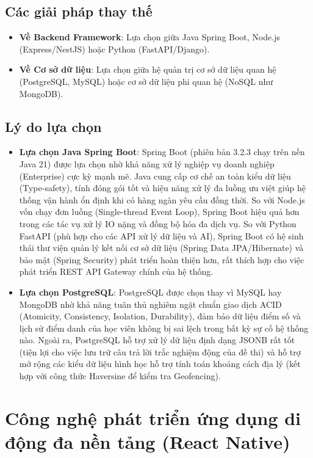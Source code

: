 \documentclass[../DoAn.tex]{subfiles}
\begin{document}
\subsection{Các giải pháp thay thế}
\begin{itemize}
    \item \textbf{Về Backend Framework}: Lựa chọn giữa Java Spring Boot, Node.js (Express/NestJS) hoặc Python (FastAPI/Django).
    \item \textbf{Về Cơ sở dữ liệu}: Lựa chọn giữa hệ quản trị cơ sở dữ liệu quan hệ (PostgreSQL, MySQL) hoặc cơ sở dữ liệu phi quan hệ (NoSQL như MongoDB).
\end{itemize}

\subsection{Lý do lựa chọn}
\begin{itemize}
    \item \textbf{Lựa chọn Java Spring Boot}: Spring Boot (phiên bản 3.2.3 chạy trên nền Java 21) được lựa chọn nhờ khả năng xử lý nghiệp vụ doanh nghiệp (Enterprise) cực kỳ mạnh mẽ. Java cung cấp cơ chế an toàn kiểu dữ liệu (Type-safety), tính đóng gói tốt và hiệu năng xử lý đa luồng ưu việt giúp hệ thống vận hành ổn định khi có hàng ngàn yêu cầu đồng thời. So với Node.js vốn chạy đơn luồng (Single-thread Event Loop), Spring Boot hiệu quả hơn trong các tác vụ xử lý IO nặng và đồng bộ hóa đa dịch vụ. So với Python FastAPI (phù hợp cho các API xử lý dữ liệu và AI), Spring Boot có hệ sinh thái thư viện quản lý kết nối cơ sở dữ liệu (Spring Data JPA/Hibernate) và bảo mật (Spring Security) phát triển hoàn thiện hơn, rất thích hợp cho việc phát triển REST API Gateway chính của hệ thống.
    \item \textbf{Lựa chọn PostgreSQL}: PostgreSQL được chọn thay vì MySQL hay MongoDB nhờ khả năng tuân thủ nghiêm ngặt chuẩn giao dịch ACID (Atomicity, Consistency, Isolation, Durability), đảm bảo dữ liệu điểm số và lịch sử điểm danh của học viên không bị sai lệch trong bất kỳ sự cố hệ thống nào. Ngoài ra, PostgreSQL hỗ trợ xử lý dữ liệu định dạng JSONB rất tốt (tiện lợi cho việc lưu trữ câu trả lời trắc nghiệm động của đề thi) và hỗ trợ mở rộng các kiểu dữ liệu hình học hỗ trợ tính toán khoảng cách địa lý (kết hợp với công thức Haversine để kiểm tra Geofencing).
\end{itemize}

\section{Công nghệ phát triển ứng dụng di động đa nền tảng (React Native)}
\label{section:3.3}
\end{document}
